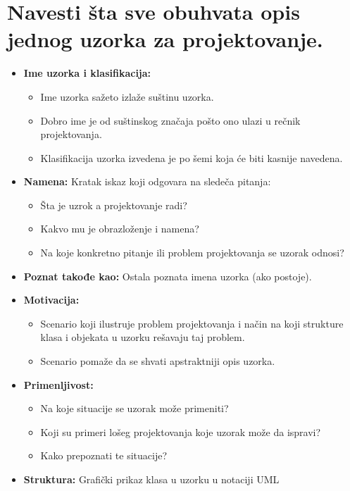\documentclass[a4paper]{article}
\begin{document}
\section{Navesti šta sve obuhvata opis jednog uzorka za projektovanje.}
  \begin{itemize}
    \item \textbf{Ime uzorka i klasifikacija:}
          \begin{itemize}
            \item Ime uzorka sažeto izlaže suštinu uzorka.
            \item Dobro ime je od suštinskog značaja pošto ono ulazi u rečnik projektovanja.
            \item Klasifikacija uzorka izvedena je po šemi koja će biti kasnije navedena.
          \end{itemize}
    \item \textbf{Namena:} Kratak iskaz koji odgovara na sledeča pitanja:
          \begin{itemize}
            \item Šta je uzrok a projektovanje radi?
            \item Kakvo mu je obrazloženje i namena?
            \item Na koje konkretno pitanje ili problem projektovanja se uzorak odnosi?
          \end{itemize}
    \item \textbf{Poznat takođe kao:} Ostala poznata imena uzorka (ako postoje).
    \item \textbf{Motivacija:}
          \begin{itemize}
            \item Scenario koji ilustruje problem projektovanja i način na koji strukture klasa 
                  i objekata u uzorku rešavaju taj problem.
            \item Scenario pomaže da se shvati apstraktniji opis uzorka.
          \end{itemize}
    \item \textbf{Primenljivost:}
          \begin{itemize}
            \item Na koje situacije se uzorak može primeniti?
            \item Koji su primeri lošeg projektovanja koje uzorak može da ispravi?
            \item Kako prepoznati te situacije?
          \end{itemize}
    \item \textbf{Struktura:} Grafički prikaz klasa u uzorku u notaciji UML 

\end{itemize}
\end{document}
